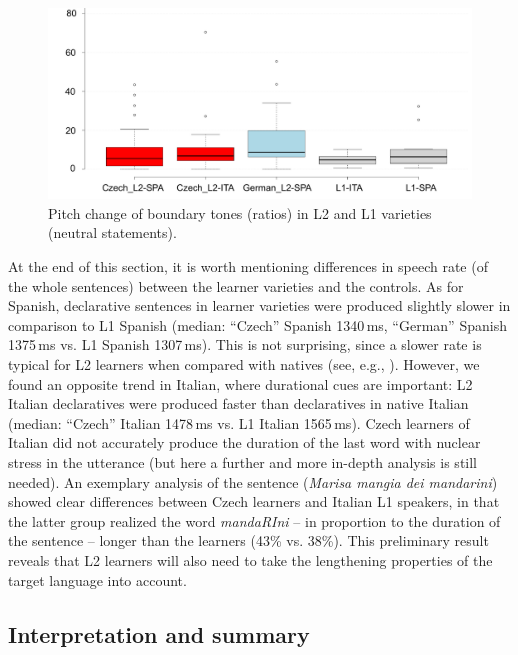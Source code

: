 \begin{figure}


\includegraphics[width=\textwidth]{figures/Figure_23.pdf}



\caption{Pitch change of boundary tones (ratios) in L2 and L1 varieties (neutral statements).}
\label{fig:4.23}
\end{figure}


At the end of this section, it is worth mentioning differences in speech rate (of the whole sentences) between the learner varieties and the controls. As for Spanish, declarative sentences in learner varieties were produced slightly slower in comparison to L1 Spanish (median: “Czech”  Spanish 1340\,ms, “German” Spanish 1375\,ms vs. L1 Spanish 1307\,ms). This is not surprising, since a slower rate is typical for L2 learners when compared with natives (see, e.g., \citealt{DerwingMunro1997, DerwingEtAl2004}). However, we found an opposite trend in Italian, where durational cues are important: L2 Italian declaratives were produced faster than declaratives in native Italian (median: “Czech” Italian 1478\,ms vs. L1 Italian 1565\,ms). Czech learners of Italian did not accurately produce the duration of the last word with nuclear stress in the utterance (but here a further and more in-depth analysis is still needed). An exemplary analysis of the sentence (\textit{Marisa mangia dei mandarini}) showed clear differences between Czech learners and Italian L1 speakers, in that the latter group realized the word \textit{mandaRIni} -- in proportion to the duration of the sentence -- longer than the learners (43\% vs. 38\%). This preliminary result reveals that L2 learners will also need to take the lengthening properties of the target language into account.


\subsection{Interpretation and summary}\label{sec:4.1.5}

